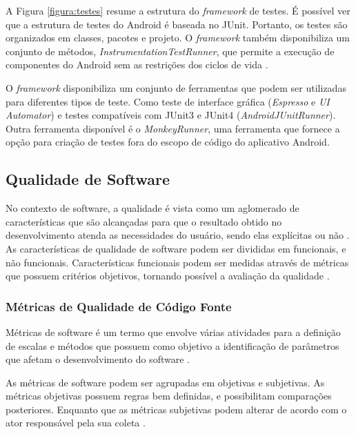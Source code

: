 A Figura \ref{figura:testes} resume a estrutura do \textit{framework} de testes. É possível ver que a estrutura de testes do Android é baseada no JUnit. Portanto, os testes são organizados em classes, pacotes e projeto. O \textit{framework} também disponibiliza um conjunto de métodos, \textit{InstrumentationTestRunner}, que permite a execução de componentes do Android sem as restrições dos ciclos de vida \cite{androidTesting2015}.

O \textit{framework} disponibiliza um conjunto de ferramentas que podem ser utilizadas para diferentes tipos de teste. Como teste de interface gráfica (\textit{Espresso} e \textit{UI Automator}) e testes compatíveis com JUnit3 e JUnit4 (\textit{AndroidJUnitRunner}). Outra ferramenta disponível é o \textit{MonkeyRunner}, uma ferramenta que fornece a opção para criação de testes fora do escopo de código do aplicativo Android.


  \subsection{Qualidade de Software}
  \label{subsec:qualidadedesoftware}

No contexto de software, a qualidade é vista como um aglomerado de características
que são alcançadas para que o resultado obtido no desenvolvimento
atenda as necessidades do usuário, sendo elas explícitas ou não \cite{rocha2001}.
As características de qualidade de software podem ser divididas em funcionais,
e não funcionais. Características funcionais podem ser medidas através de métricas
que possuem critérios objetivos, tornando possível a avaliação da qualidade \cite{meirelles2013}.

    \subsubsection{Métricas de Qualidade de Código Fonte}

Métricas de software é um termo que envolve várias atividades para a definição de
escalas e métodos que possuem como objetivo a identificação de parâmetros que afetam o
desenvolvimento do software \cite{metrics}.

As métricas de software podem ser agrupadas em objetivas e subjetivas. As métricas
objetivas possuem regras bem definidas, e possibilitam comparações posteriores.
Enquanto que as métricas subjetivas podem alterar de acordo com o ator responsável
pela sua coleta \cite{meirelles2013}.

